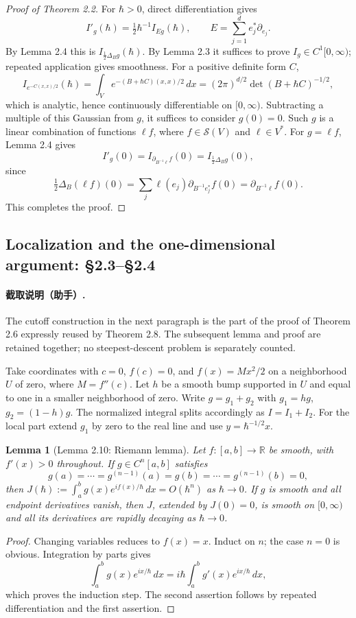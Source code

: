 \documentclass[UTF8,11pt,a4paper]{ctexart}
\newtheorem*{lemma}{Lemma}
\theoremstyle{definition}\newtheorem*{definition}{Definition}
\theoremstyle{remark}\newtheorem*{remark}{Remark}
\newcommand{\R}{\mathbb R}
\begin{document}
\begin{proof}[Proof of Theorem 2.2]
For $\hbar>0$, direct differentiation gives
\[
I'_g(\hbar)=\tfrac12\hbar^{-1}I_{Eg}(\hbar),\qquad
E=\sum_{j=1}^d e_j^*\partial_{e_j}.
\]
By Lemma 2.4 this is $I_{\frac12\Delta_Bg}(\hbar)$. By Lemma 2.3 it suffices to prove $I_g\in C^1[0,\infty)$; repeated application gives smoothness.
For a positive definite form $C$,
\[
I_{e^{-C(x,x)/2}}(\hbar)
=\int_V e^{-(B+\hbar C)(x,x)/2}\,dx
=(2\pi)^{d/2}\det(B+\hbar C)^{-1/2},
\]
which is analytic, hence continuously differentiable on $[0,\infty)$. Subtracting a multiple of this Gaussian from $g$, it suffices to consider $g(0)=0$.
Such $g$ is a linear combination of functions $\ell f$, where $f\in\mathcal S(V)$ and $\ell\in V^*$. For $g=\ell f$, Lemma 2.4 gives
\[
I'_g(0)=I_{\partial_{B^{-1}\ell}f}(0)=I_{\frac12\Delta_Bg}(0),
\]
since
\[
\tfrac12\Delta_B(\ell f)(0)
=\sum_j\ell(e_j)\partial_{B^{-1}e_j^*}f(0)
=\partial_{B^{-1}\ell}f(0).
\]
This completes the proof.
\end{proof}

\subsection*{Localization and the one-dimensional argument: §2.3--§2.4}
\paragraph{截取说明（助手）.} The cutoff construction in the next paragraph is the part of the proof of Theorem 2.6 expressly reused by Theorem 2.8. The subsequent lemma and proof are retained together; no steepest-descent problem is separately counted.

Take coordinates with $c=0$, $f(c)=0$, and $f(x)=Mx^2/2$ on a neighborhood $U$ of zero, where $M=f''(c)$. Let $h$ be a smooth bump supported in $U$ and equal to one in a smaller neighborhood of zero. Write $g=g_1+g_2$ with $g_1=hg$, $g_2=(1-h)g$. The normalized integral splits accordingly as $I=I_1+I_2$. For the local part extend $g_1$ by zero to the real line and use $y=\hbar^{-1/2}x$.

\begin{lemma}[Lemma 2.10: Riemann lemma]
Let $f:[a,b]\to\R$ be smooth, with $f'(x)>0$ throughout. If $g\in C^n[a,b]$ satisfies
\[
g(a)=\cdots=g^{(n-1)}(a)=g(b)=\cdots=g^{(n-1)}(b)=0,
\]
then $J(\hbar):=\int_a^b g(x)e^{if(x)/\hbar}\,dx=O(\hbar^n)$ as $\hbar\to0$.
If $g$ is smooth and all endpoint derivatives vanish, then $J$, extended by $J(0)=0$, is smooth on $[0,\infty)$ and all its derivatives are rapidly decaying as $\hbar\to0$.
\end{lemma}
\begin{proof}
Changing variables reduces to $f(x)=x$. Induct on $n$; the case $n=0$ is obvious. Integration by parts gives
\[
\int_a^b g(x)e^{ix/\hbar}\,dx
=i\hbar\int_a^b g'(x)e^{ix/\hbar}\,dx,
\]
which proves the induction step. The second assertion follows by repeated differentiation and the first assertion.
\end{proof}
\end{document}
